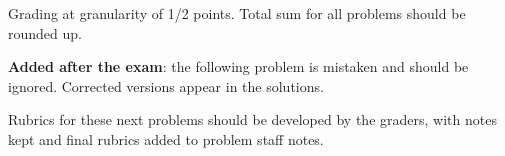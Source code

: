\documentclass[quiz]{mcs}
\begin{document}
\renewcommand{\exampreamble}{   %
  \begin{tabular}{l}
    \textbf{Circle your}\quad   \teaminfo
  \end{tabular}

  \begin{itemize}

  \item
   This exam is \textbf{closed book} except for a 1-sided cribsheet.
   Total time is 20 minutes. 

  \item
   Write your solutions in the space provided.  If you need more
   space, write on the back of the sheet containing the problem.

\iffalse
  \item
   GOOD LUCK!
\fi

  \end{itemize}}




\begin{staffnotes}
Grading at granularity of 1/2 points.  Total sum for all problems
should be rounded up.
\end{staffnotes}


\textbf{Added after the exam}: the following problem is mistaken and
should be ignored.  Corrected versions appear in the solutions.





\examspace

\begin{staffnotes}
Rubrics for these next problems should be developed by the graders,
with notes kept and final rubrics added to problem staff notes.
\end{staffnotes}




\end{document}
